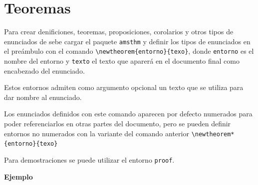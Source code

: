 \documentclass[
  letterpaper,
  DIV=11,
  numbers=noendperiod]{scrreport}
\begin{document}
\hypertarget{teoremas}{%
\section{Teoremas}\label{teoremas}}

Para crear denificiones, teoremas, proposiciones, corolarios y otros
tipos de enunciados de sebe cargar el paquete \texttt{amsthm} y definir
los tipos de enunciados en el preámbulo con el comando
\texttt{\textbackslash{}newtheorem\{entorno\}\{texo\}}, donde
\texttt{entorno} es el nombre del entorno y \texttt{texto} el texto que
aparerá en el documento final como encabezado del enunciado.

Estos entornos admiten como argumento opcional un texto que se utiliza
para dar nombre al enunciado.

Los enunciados definidos con este comando aparecen por defecto numerados
para poder referenciarlos en otras partes del documento, pero se pueden
definir entornos no numerados con la variante del comando anterior
\texttt{\textbackslash{}newtheorem*\{entorno\}\{texo\}}

Para demostraciones se puede utilizar el entorno \texttt{proof}.

\textbf{Ejemplo}
\end{document}
